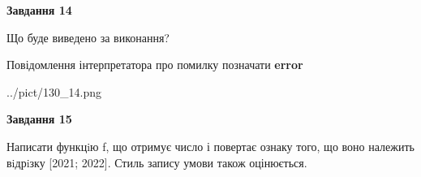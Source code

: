 \documentclass[11pt, ukrainian]{article}
\begin{document}
{\begin {large}
{\begin {center}\textbf{Завдання 14}\end {center}}\par
Що буде виведено за виконання? \par
Повідомлення інтерпретатора про помилку позначати \textbf{error}

\begin{center}
	{../pict/130_14.png}
\end{center}
\newpage

{\begin {center}\textbf{Завдання 15}\end {center}}\par

Написати функцiю f, що отримує число і повертає ознаку того, що воно належить вiдрiзку [2021; 2022]. Стиль запису умови також оцінюється.\par
\newpage

\end {large}}
\end{document}
